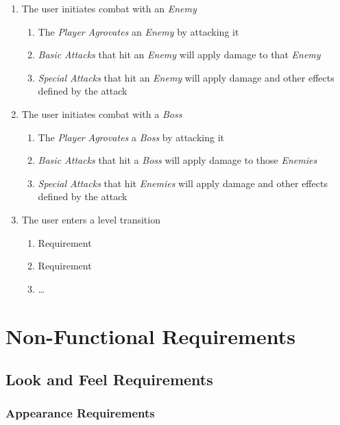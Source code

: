 \documentclass[12pt, titlepage]{article}
\begin{document}
\begin{enumerate}[{VP}1.]
\begin{enumerate}[{BE1}.1]
    \item The user initiates combat with an \textit{Enemy}
    \begin{enumerate}
      \item The \textit{Player} \textit{Agrovates} an \textit{Enemy} by attacking it  
      \item \textit{Basic Attacks} that hit an \textit{Enemy} will apply damage to that \textit{Enemy}
      \item \textit{Special Attacks} that hit an \textit{Enemy} will apply damage and other effects defined by the attack
    \end{enumerate}

    \item The user initiates combat with a \textit{Boss}
    \begin{enumerate}
      \item The \textit{Player} \textit{Agrovates} a \textit{Boss} by attacking it
      \item \textit{Basic Attacks} that hit a \textit{Boss} will apply damage to those \textit{Enemies}
      \item \textit{Special Attacks} that hit \textit{Enemies} will apply damage and other effects defined by the attack
    \end{enumerate}

    \item The user enters a level transition
    \begin{enumerate}
      \item Requirement
      \item Requirement
      \item \dots
    \end{enumerate}

  \end{enumerate}
\end{enumerate}

\section{Non-Functional Requirements}

  \subsection {Look and Feel Requirements}

    \subsubsection{Appearance Requirements}
\end{document}
